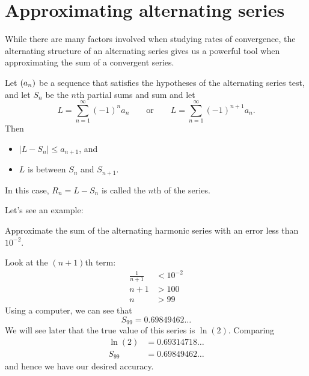 \documentclass{ximera}
\begin{document}
\section{Approximating alternating series}


While there are many factors involved when studying rates of
convergence, the alternating structure of an alternating series gives
us a powerful tool when approximating the sum of a convergent series.

\begin{theorem}
Let $\left( a_n \right)$ be a sequence that satisfies the hypotheses of the
alternating series test, and let $S_n$ be the $n$th partial sums and
sum and let
\[
L = \sum_{n=1}^\infty (-1)^{n}a_n\qquad\text{or}\qquad L=\sum_{n=1}^\infty (-1)^{n+1}a_n.
\]
Then
\begin{itemize}
\item $|L-S_n| \leq a_{n+1}$, and
\item $L$ is between $S_n$ and $S_{n+1}$.
\end{itemize}
In this case, $R_n=L-S_n$ is called the $n$th  of the
series.
\end{theorem}

Let's see an example:

\begin{example}
Approximate the sum of the alternating harmonic series with an error less than $10^{-2}$.
\begin{explanation}
  Look at the $(n+1)$th term:
	\begin{align*}
	\frac{1}{n+1} &< 10^{-2}\\
	n+1&> 100\\
	n&> 99 
	\end{align*}
	Using a computer, we can see that
        \[
        S_{99} = 0.69849462\dots
        \]
        We will see later that the true value of this series is $\ln(2)$. Comparing
        \begin{align*}
          \ln(2) &= 0.69314718\dots\\
          S_{99} &= 0.69849462\dots
        \end{align*}
        and hence we have our desired accuracy.
\end{explanation}
\end{example}

\end{document}

